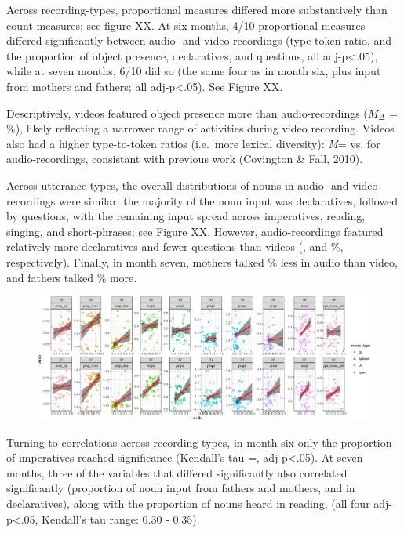 \documentclass[man]{apa6}
\theoremstyle{definition}
\theoremstyle{definition}
\theoremstyle{definition}
\theoremstyle{remark}
\begin{document}
Across recording-types, proportional measures differed more
substantively than count measures; see figure XX. At six months, 4/10
proportional measures differed significantly between audio- and
video-recordings (type-token ratio, and the proportion of object
presence, declaratives, and questions, all adj-p\textless{}.05), while
at seven months, 6/10 did so (the same four as in month six, plus input
from mothers and fathers; all adj-p\textless{}.05). See Figure XX.

Descriptively, videos featured object presence more than
audio-recordings (\(M_{\Delta}\) = \%), likely reflecting a narrower
range of activities during video recording. Videos also had a higher
type-to-token ratios (i.e.~more lexical diversity): \emph{M}= vs. for
audio-recordings, consistant with previous work (Covington \& Fall,
2010).

Across utterance-types, the overall distributions of nouns in audio- and
video-recordings were similar: the majority of the noun input was
declaratives, followed by questions, with the remaining input spread
across imperatives, reading, singing, and short-phrases; see Figure XX.
However, audio-recordings featured relatively more declaratives and
fewer questions than videos (, and \%, respectively). Finally, in month
seven, mothers talked \% less in audio than video, and fathers talked \%
more.

\begin{figure}
\centering
\includegraphics{sixseven_papaja_files/figure-latex/gr_derived_props_av-1.pdf}
\caption{}
\end{figure}

Turning to correlations across recording-types, in month six only the
proportion of imperatives reached significance (Kendall's tau =,
adj-p\textless{}.05). At seven months, three of the variables that
differed significantly also correlated significantly (proportion of noun
input from fathers and mothers, and in declaratives), along with the
proportion of nouns heard in reading, (all four adj-p\textless{}.05,
Kendall's tau range: 0.30 - 0.35).
\end{document}
